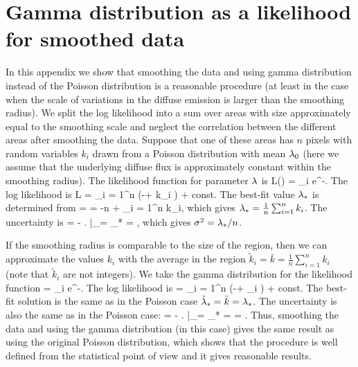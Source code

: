 \newpage
\section{Gamma distribution as a likelihood for smoothed data}

In this appendix we show that smoothing the data and using gamma distribution instead of the Poisson distribution
is a reasonable procedure (at least in the case when the scale of variations in the diffuse emission is larger than the smoothing radius).
We split the log likelihood into a sum over areas with size approximately equal to the smoothing scale
and neglect the correlation between the different areas after smoothing the data.
Suppose that one of these areas has $n$ pixels with random variables $k_i$ drawn from a Poisson distribution with mean $\lambda_0$
(here we assume that the underlying diffuse flux is approximately constant within the smoothing radius).
The likelihood function for parameter $\lambda$ is
\be
L(\ld) = \prod_i  e^{-\ld}.
\ee
The log likelihood is
\be
\log L = \sum_{i = 1}^n (-\ld + k_i \log \ld) + const.
\ee
The best-fit value $\lambda_*$ is determined from
 =  = -n +  \sum_{i = 1}^n k_i,
\ee
which gives $\lambda_* = \frac{1}{n} \sum_{i = 1}^n k_i$.
The uncertainty is
\be
{} = - \left.  \right|_{\ld = \ld_*} = ,
\ee
which gives $\sigma^2 = \lambda_* / n$.

If the smoothing radius is comparable to the size of the region,
then we can approximate the values $k_i$ with the average in the region $\tilde{k}_i = \bar{k} = \frac{1}{n} \sum_{i = 1}^n k_i$
(note that $\tilde{k}_i$ are not integers).
We take the gamma distribution for the likelihood function 
\be
{} = \prod_i  e^{-\ld}.
\ee
The log likelihood is
\be
\log {} = \sum_{i = 1}^n (-\ld + _i \log \ld) + const.
\ee
The best-fit solution is the same as in the Poisson case $\tilde{\lambda}_* = \bar{k} = {\lambda}_*$.
The uncertainty is also the same as in the Poisson case:
\be
{} = - \left.  \right|_{\ld = \td{\ld}_*} =  = .
\ee
Thus, smoothing the data and using the gamma distribution (in this case) gives the same result as using the original Poisson distribution,
which shows that the procedure is well defined from the statistical point of view and it gives reasonable results.